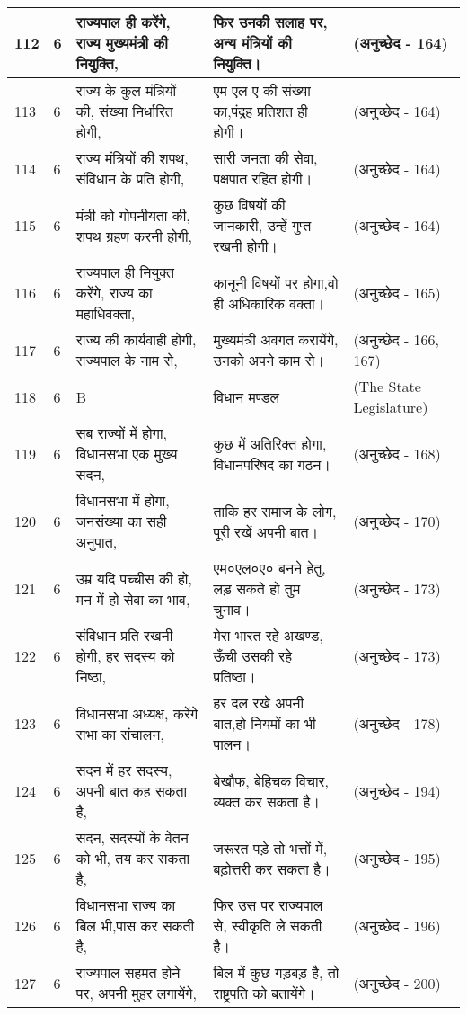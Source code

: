 \begin{longtable}{|l|l|l|l|l|}
112 & 6 & राज्यपाल ही करेंगे, राज्य मुख्यमंत्री की नियुक्ति, & फिर उनकी सलाह पर, अन्य मंत्रियों की नियुक्ति। & (अनुच्छेद - 164) \\ \hline 
113 & 6 & राज्य के कुल मंत्रियों की, संख्या निर्धारित होगी, & एम एल ए की संख्या का,पंद्रह प्रतिशत ही होगी। & (अनुच्छेद - 164) \\ \hline 
114 & 6 & राज्य मंत्रियों की शपथ, संविधान के प्रति होगी, & सारी जनता की सेवा, पक्षपात रहित होगी। & (अनुच्छेद - 164) \\ \hline 
115 & 6 & मंत्री को गोपनीयता की, शपथ ग्रहण करनी होगी, & कुछ विषयों की जानकारी, उन्हें गुप्त रखनी होगी। & (अनुच्छेद - 164) \\ \hline 
116 & 6 & राज्यपाल ही नियुक्त करेंगे, राज्य का महाधिवक्ता, & कानूनी विषयों पर होगा,वो ही अधिकारिक वक्ता। & (अनुच्छेद - 165) \\ \hline 
117 & 6 & राज्य की कार्यवाही होगी, राज्यपाल के नाम से, & मुख्यमंत्री अवगत करायेंगे, उनको अपने काम से। & (अनुच्छेद - 166, 167) \\ \hline 
118 & 6 & B & विधान मण्डल  & (The State Legislature) \\ \hline 
119 & 6 & सब राज्यों में होगा, विधानसभा एक मुख्य सदन, & कुछ में अतिरिक्त होगा, विधानपरिषद का गठन। & (अनुच्छेद - 168) \\ \hline 
120 & 6 & विधानसभा में होगा, जनसंख्या का सही अनुपात, & ताकि हर समाज के लोग, पूरी रखें अपनी बात। & (अनुच्छेद - 170) \\ \hline 
121 & 6 & उम्र यदि पच्चीस की हो, मन में हो सेवा का भाव, & एम०एल०ए० बनने हेतु, लड़ सकते हो तुम चुनाव। & (अनुच्छेद - 173) \\ \hline 
122 & 6 & संविधान प्रति रखनी होगी, हर सदस्य को निष्ठा, & मेरा भारत रहे अखण्ड, ऊँची उसकी रहे प्रतिष्ठा। & (अनुच्छेद - 173) \\ \hline 
123 & 6 & विधानसभा अध्यक्ष, करेंगे सभा का संचालन, & हर दल रखे अपनी बात,हो नियमों का भी पालन। & (अनुच्छेद - 178) \\ \hline 
124 & 6 & सदन में हर सदस्य, अपनी बात कह सकता है, & बेखौफ, बेहिचक विचार, व्यक्त कर सकता है। & (अनुच्छेद - 194) \\ \hline 
125 & 6 & सदन, सदस्यों के वेतन को भी, तय कर सकता है, & जरूरत पड़े तो भत्तों में, बढ़ोत्तरी कर सकता है। & (अनुच्छेद - 195) \\ \hline 
126 & 6 & विधानसभा राज्य का बिल भी,पास कर सकती है, & फिर उस पर राज्यपाल से, स्वीकृति ले सकती है। & (अनुच्छेद - 196) \\ \hline 
127 & 6 & राज्यपाल सहमत होने पर, अपनी मुहर लगायेंगे, & बिल में कुछ गड़बड़ है, तो राष्ट्रपति को बतायेंगे। & (अनुच्छेद - 200) \\ \hline 

\end{longtable}
